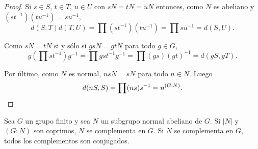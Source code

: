 \begin{proof}
	Si $s\in S$, $t\in T$, $u\in U$ con $sN=tN=uN$ entonces, como $N$ es
	abeliano y $(st^{-1})(tu^{-1})=su^{-1}$, 
	\[
		d(S,T)d(T,U)=\prod (st^{-1})(tu^{-1})=\prod su^{-1}=d(S,U).
	\]

	Como $sN=tN$ si y sólo si $gsN=gtN$ para todo $g\in G$, 
	\[
	g\left(\prod st^{-1}\right)g^{-1}=\prod gst^{-1}g^{-1}=\prod (gs)(gt)^{-1}=d(gS,gT).
	\]

	Por último, como $N$ es normal, $nsN=sN$ para todo $n\in N$. Luego
	\[
		d(nS,S)=\prod (ns)s^{-1}=n^{(G:N)}.\qedhere
	\]
\end{proof}

\begin{theorem}
	\label{theorem:SchurZassenhaus:abeliano}
	Sea $G$ un grupo finito y sea $N$ un subgrupo normal abeliano de $G$. Si
	$|N|$ y $(G:N)$ son coprimos, $N$ se complementa en $G$. Si $N$ se
	complementa en $G$, todos los complementos son conjugados.  
\end{theorem}

